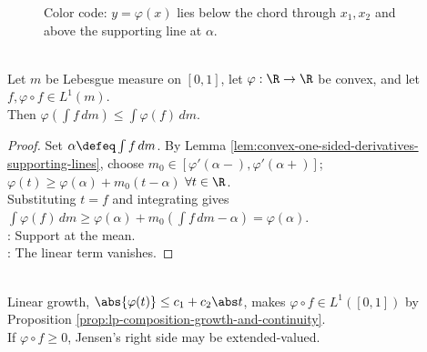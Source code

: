 \begin{figure}[H]
  \centering
  
  \caption{Color code: \textcolor{blue!70!black}{$y=\varphi(x)$} lies below the \textcolor{orange!80!black}{chord} through $x_1,x_2$ and above the \textcolor{green!45!black}{supporting line} at $\alpha$.}
  \label{fig:convex-chord-supporting-line}
\end{figure}

\begin{theorem} \label{thm:jensen-inequality-lebesgue-unit-interval} \\
Let $m$ be Lebesgue measure on $[0,1]$, let $\varphi:\R\to\R$ be convex, and let $f,\varphi\circ f\in L^1(m)$.\\
Then $\varphi\left(\int f\,dm\right)\leq\int\varphi(f)\,dm$.
\begin{proof}
Set $\alpha\defeq\int f\,dm$. By Lemma \ref{lem:convex-one-sided-derivatives-supporting-lines}, choose $m_0\in[\varphi'(\alpha-),\varphi'(\alpha+)]$; $\varphi(t)\geq\varphi(\alpha)+m_0(t-\alpha)$ $\forall t\in\R$.\\
Substituting $t=f$ and integrating gives $\int\varphi(f)\,dm\geq\varphi(\alpha)+m_0(\int f\,dm-\alpha)=\varphi(\alpha)$.\\
: Support at the mean.\\
: The linear term vanishes.
\end{proof}
\end{theorem}

\begin{remark} \label{rem:jensen-integrability-growth-condition} \\
Linear growth, $\abs{\varphi(t)}\leq c_1+c_2\abs t$, makes $\varphi\circ f\in L^1([0,1])$ by Proposition \ref{prop:lp-composition-growth-and-continuity}.\\
If $\varphi\circ f\geq0$, Jensen's right side may be extended-valued.
\end{remark}
